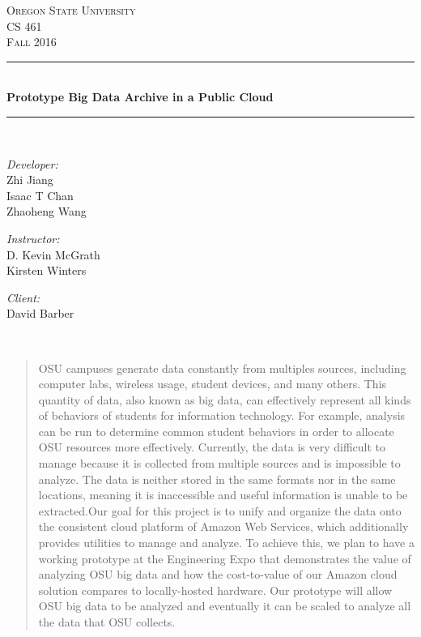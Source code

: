\documentclass[letterpaper,10pt]{article}
\date{}
\begin{document}
    \begin{titlepage}
    \newcommand{\HRule}{\rule{\linewidth}{0.5mm}}
    \center 
    \textsc{\Large Oregon State University}\\[1.5cm] 
    \textsc{\Large CS 461}\\[0.5cm] 
    \textsc{\Large Fall 2016}\\[0.5cm] 
    \HRule \\[0.4cm]
    { \huge \bfseries Prototype Big Data Archive in a Public Cloud}\\[0.4cm] %
    \HRule \\[1.5cm]
    \begin{minipage}{0.4\textwidth}
        \begin{flushleft} \large
        \emph{Developer:}\\
        Zhi Jiang\\
        Isaac T Chan\\
        Zhaoheng Wang
        \end{flushleft}
    \end{minipage}
    \begin{minipage}{0.4\textwidth}
        \begin{flushright} \large
        \emph{Instructor:} \\
        D. Kevin McGrath\\
    Kirsten Winters
        \end{flushright}
        \begin{flushright} \large
        \emph{Client:} \\
        David Barber
        \end{flushright}
    \end{minipage}\\[2cm]

  \begin{abstract}
    OSU campuses generate data constantly from multiples sources, including computer labs, wireless usage, student devices, and many others. This quantity of data, also known as big data, can effectively represent all kinds of behaviors of students for information technology. For example, analysis can be run to determine common student behaviors in order to allocate OSU resources more effectively. Currently, the data is very difficult to manage because it is collected from multiple sources and is impossible to analyze. The data is neither stored in the same formats nor in the same locations, meaning it is inaccessible and useful information is unable to be extracted.Our goal for this project is to unify and organize the data onto the consistent cloud platform of Amazon Web Services, which additionally provides utilities to manage and analyze. To achieve this, we plan to have a working prototype at the Engineering Expo that demonstrates the value of analyzing OSU big data and how the cost-to-value of our Amazon cloud solution compares to locally-hosted hardware. Our prototype will allow OSU big data to be analyzed and eventually it can be scaled to analyze all the data that OSU collects.
    \end{abstract}
    \vfill %
    \end{titlepage}
\end{document}
